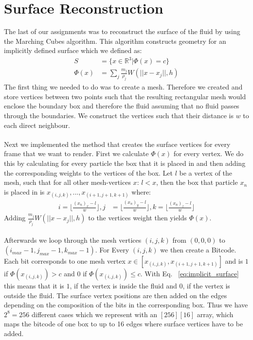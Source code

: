 \documentclass{ACGSeminar}
\begin{document}
\section{Surface Reconstruction}
The last of our assignments was to reconstruct the surface of the fluid by using the Marching Cubes algorithm. This algorithm constructs geometry for an implicitly defined surface which we defined as:
\begin{equation} \label{eq:implicit_surface}
\begin{aligned}
S &=\{ x \in \mathbb{R}^3 | \Phi(x) = c \} \\
\Phi(x) &= \sum_j \frac{m_j}{\rho_j} W(||x-x_j||, h)
\end{aligned}
\end{equation}
The first thing we needed to do was to create a mesh. Therefore we created and store vertices between two points such that the resulting rectangular mesh would enclose the boundary box and therefore the fluid assuming that no fluid passes through the boundaries. We construct the vertices such that their distance is \(w\) to each direct neighbour. \\
\\
Next we implemented the method that creates the surface vertices for every frame that we want to render. First we calculate \(\Phi(x)\) for every vertex. We do this by calculating for every particle the box that it is placed in and then adding the corresponding weights to the vertices of the box. Let \(l\) be a vertex of the mesh, such that for all other mesh-vertices \(x\): \(l < x\), then the box that particle \(x_n\) is placed in is \(x_{(i,j,k)},..., x_{(i+1, j+1, k+1)}\) where: 
\begin{equation} \label{eq:implicit_surface}
\begin{aligned}
i = \lfloor \frac{(x_n)_x - l}{w} \rfloor, j &= \lfloor \frac{(x_n)_y - l}{w} \rfloor, k = \lfloor \frac{(x_n)_z - l}{w} \rfloor
\end{aligned}
\end{equation}
Adding \(\frac{m_j}{\rho_j} W(||x-x_j||, h)\) to the vertices weight then yields \(\Phi(x)\). \\
\\
Afterwards we loop through the mesh vertices \((i,j,k)\)  from \((0,0,0)\) to \((i_{max}-1,j_{max}-1,k_{max}-1)\). For Every \((i,j,k)\) we then create a Bitcode. Each bit corresponds to one mesh vertex \(x \in [x_{(i,j,k)}, x_{(i+1,j+1,k+1)}] \) and is \(1\) if \(\Phi(x_{(i,j,k)}) > c\) and \(0\) if \(\Phi(x_{(i,j,k)}) \leq c\). With Eq. ~\ref{eq:implicit_surface} this means that it is \(1\), if the vertex is inside the fluid and \(0\), if the vertex is outside the fluid. The surface vertex positions are then added on the edges depending on the composition of the bits in the corresponding box. Thus we have \(2^8 = 256\) different cases which we represent with an \([256][16]\) array, which maps the bitcode of one box to up to 16 edges where surface vertices have to be added.\\
\end{document}
